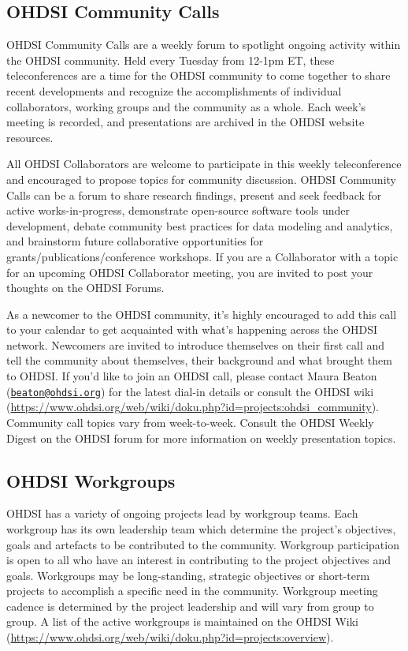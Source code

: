 \documentclass[11pt]{book}
\theoremstyle{definition}
\theoremstyle{definition}
\theoremstyle{definition}
\theoremstyle{remark}
\begin{document}
\hypertarget{ohdsi-community-calls}{%
\subsection{OHDSI Community Calls}\label{ohdsi-community-calls}}

OHDSI Community Calls are a weekly forum to spotlight ongoing activity within the OHDSI community. Held every Tuesday from 12-1pm ET, these teleconferences are a time for the OHDSI community to come together to share recent developments and recognize the accomplishments of individual collaborators, working groups and the community as a whole. Each week's meeting is recorded, and presentations are archived in the OHDSI website resources.

All OHDSI Collaborators are welcome to participate in this weekly teleconference and encouraged to propose topics for community discussion. OHDSI Community Calls can be a forum to share research findings, present and seek feedback for active works-in-progress, demonstrate open-source software tools under development, debate community best practices for data modeling and analytics, and brainstorm future collaborative opportunities for grants/publications/conference workshops. If you are a Collaborator with a topic for an upcoming OHDSI Collaborator meeting, you are invited to post your thoughts on the OHDSI Forums.

As a newcomer to the OHDSI community, it's highly encouraged to add this call to your calendar to get acquainted with what's happening across the OHDSI network. Newcomers are invited to introduce themselves on their first call and tell the community about themselves, their background and what brought them to OHDSI. If you'd like to join an OHDSI call, please contact Maura Beaton (\href{mailto:beaton@ohdsi.org}{\nolinkurl{beaton@ohdsi.org}}) for the latest dial-in details or consult the OHDSI wiki (\url{https://www.ohdsi.org/web/wiki/doku.php?id=projects:ohdsi_community}). Community call topics vary from week-to-week. Consult the OHDSI Weekly Digest on the OHDSI forum for more information on weekly presentation topics.

\hypertarget{ohdsi-workgroups}{%
\subsection{OHDSI Workgroups}\label{ohdsi-workgroups}}

OHDSI has a variety of ongoing projects lead by workgroup teams. Each workgroup has its own leadership team which determine the project's objectives, goals and artefacts to be contributed to the community. Workgroup participation is open to all who have an interest in contributing to the project objectives and goals. Workgroups may be long-standing, strategic objectives or short-term projects to accomplish a specific need in the community. Workgroup meeting cadence is determined by the project leadership and will vary from group to group. A list of the active workgroups is maintained on the OHDSI Wiki (\url{https://www.ohdsi.org/web/wiki/doku.php?id=projects:overview}).
\end{document}

